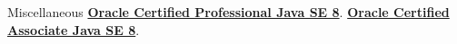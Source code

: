 \begin{rubric}{Miscellaneous}
    \entry*[2018] \textbf{\href{https://www.youracclaim.com/badges/c3d44a4e-fabc-4abb-b4fd-2079a364f6bd/public_url}{Oracle Certified Professional Java SE 8}}.
    \entry*[2017] \textbf{\href{https://www.youracclaim.com/badges/fead7b2a-0382-45ea-9566-fb5a39d71972/public_url}{Oracle Certified Associate Java SE 8}}.
\end{rubric}